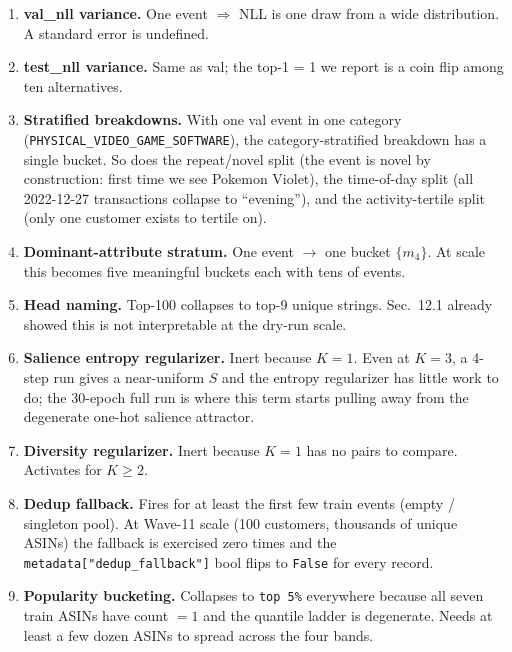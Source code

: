 \documentclass[11pt,a4paper]{article}
\begin{document}
\begin{enumerate}
\item \textbf{val\_nll variance.} One event $\Rightarrow$ NLL is one
draw from a wide distribution. A standard error is undefined.

\item \textbf{test\_nll variance.} Same as val; the top-1 = 1 we
report is a coin flip among ten alternatives.

\item \textbf{Stratified breakdowns.} With one val event in one
category (\texttt{PHYSICAL\_VIDEO\_GAME\_SOFTWARE}), the
category-stratified breakdown has a single bucket. So does the
repeat/novel split (the event is novel by construction: first time we
see Pokemon Violet), the time-of-day split (all 2022-12-27
transactions collapse to ``evening''), and the activity-tertile split
(only one customer exists to tertile on).

\item \textbf{Dominant-attribute stratum.} One event $\to$ one bucket
$\{m_4\}$. At scale this becomes five meaningful buckets each with
tens of events.

\item \textbf{Head naming.} Top-100 collapses to top-9 unique strings.
Sec.~12.1 already showed this is not interpretable at the dry-run
scale.

\item \textbf{Salience entropy regularizer.} Inert because $K = 1$.
Even at $K = 3$, a 4-step run gives a near-uniform $S$ and the entropy
regularizer has little work to do; the 30-epoch full run is where this
term starts pulling away from the degenerate one-hot salience
attractor.

\item \textbf{Diversity regularizer.} Inert because $K = 1$ has no
pairs to compare. Activates for $K \geq 2$.

\item \textbf{Dedup fallback.} Fires for at least the first few train
events (empty / singleton pool). At Wave-11 scale (100 customers,
thousands of unique ASINs) the fallback is exercised zero times and
the \texttt{metadata["dedup\_fallback"]} bool flips to \texttt{False}
for every record.

\item \textbf{Popularity bucketing.} Collapses to \texttt{top 5\%}
everywhere because all seven train ASINs have count $= 1$ and the
quantile ladder is degenerate. Needs at least a few dozen ASINs to
spread across the four bands.


\end{enumerate}
\end{document}
